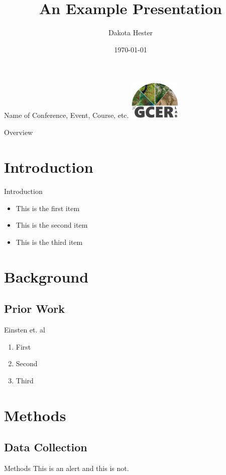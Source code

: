 \documentclass[aspectratio=169]{beamer}
\title{An Example Presentation}
\author{Dakota Hester}
\institute{Mississippi State University \\ Department of Agricultural and Biological Engineering}
\date{\today}
\begin{document}
\begin{frame}{Name of Conference, Event, Course, etc.}
    \titlepage
    \centering
    \includegraphics[width=2.5cm]{images/gcerlogo.png}
\end{frame}

\begin{frame}{Overview}
    \tableofcontents
\end{frame}

\section{Introduction}
\begin{frame}{Introduction}
    \begin{itemize}
        \item This is the first item
        \item This is the second item
        \item This is the third item
    \end{itemize}
\end{frame}

\section{Background}

\subsection{Prior Work}
\begin{frame}{Einsten et. al}
    \begin{enumerate}
        \item First
        \item Second
        \item Third
    \end{enumerate}
\end{frame}

\section{Methods}

\subsection{Data Collection}
\begin{frame}{Methods}
    \alert{This is an alert} and this is not.
\end{frame}
\end{document}
